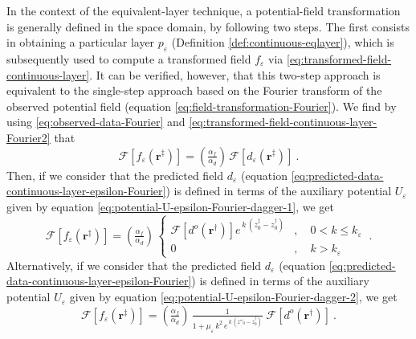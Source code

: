 \documentclass[manuscript,noblind]{geophysics}
\begin{document}
	
	In the context of the equivalent-layer technique, a potential-field transformation is generally defined
	in the space domain, by following two steps. The first consists in obtaining a particular layer $p_{\varepsilon}$ 
	(Definition \ref{def:continuous-eqlayer}), which is subsequently used to compute a transformed field $f_{\varepsilon}$ via 
	\ref{eq:transformed-field-continuous-layer}.
	It can be verified, however, that this two-step approach is equivalent to the single-step approach based on the 
	Fourier transform of the observed potential field (equation \ref{eq:field-transformation-Fourier}). 
	We find by using \ref{eq:observed-data-Fourier} and \ref{eq:transformed-field-continuous-layer-Fourier2} that
	\begin{equation}
		\mathcal{F} [ f_{\varepsilon}(\mathbf{r}^{\ddagger}) ] =
		\left( \tfrac{\alpha_{f}}{\alpha_{d}} \right) \, \mathcal{F} [ d_{\varepsilon}(\mathbf{r}^{\ddagger}) ]
		\: .
		\label{eq:transformed-field-continuous-layer-single-step}
	\end{equation}
	Then, if we consider that the predicted field $d_{\varepsilon}$ (equation \ref{eq:predicted-data-continuous-layer-epsilon-Fourier})
	is defined in terms of the auxiliary potential $U_{\varepsilon}$ given by equation \ref{eq:potential-U-epsilon-Fourier-dagger-1},
	we get
	\begin{equation}
		\mathcal{F} [ f_{\varepsilon}(\mathbf{r}^{\ddagger}) ] =
		\left( \tfrac{\alpha_{f}}{\alpha_{d}} \right) \, 
		\begin{cases}
			\mathcal{F} \left[ d^{o}(\mathbf{r}^{\dagger}) \right] 
			e^{\, k \, (z^{\ddagger}_{0} - z^{\dagger}_{0})} & , \quad 0 < k \le k_{\varepsilon} \\
			0 & , \quad k > k_{\varepsilon} 
		\end{cases} \: .
		\label{eq:transformed-field-continuous-layer-1-single-step}
	\end{equation}
	Alternatively, if we consider that the predicted field $d_{\varepsilon}$ (equation \ref{eq:predicted-data-continuous-layer-epsilon-Fourier})
	is defined in terms of the auxiliary potential $U_{\varepsilon}$ given by equation \ref{eq:potential-U-epsilon-Fourier-dagger-2},
	we get
	\begin{equation}
		\mathcal{F} [ f_{\varepsilon}(\mathbf{r}^{\ddagger}) ] =
		\left( \tfrac{\alpha_{f}}{\alpha_{d}} \right) \, 
		\tfrac{1}{1 + \mu_{\varepsilon} \, k^{2} \, e^{\, k \, (z''_{0} - z^{\dagger}_{0})}} \;
		\mathcal{F} \left[ d^{o}(\mathbf{r}^{\dagger}) \right] \: .
		\label{eq:transformed-field-continuous-layer-2-single-step}
	\end{equation}
\end{document}
